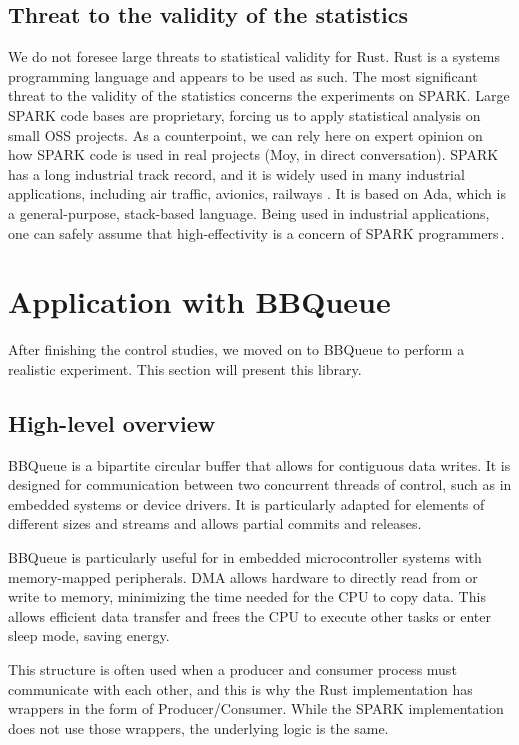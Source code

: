 \documentclass[nomenclature, english, bibtex]{kththesis}
\begin{document}
\subsection{Threat to the validity of the statistics}

We do not foresee large threats to statistical validity for Rust. Rust is a systems programming language and appears to be used as such. The most significant threat to the validity of the statistics concerns the experiments on SPARK. Large SPARK code bases are proprietary, forcing us to apply statistical analysis on small \gls{OSS} projects. As a counterpoint, we can rely here on expert opinion on how SPARK code is used in real projects (Moy, in direct conversation). SPARK has a long industrial track record, and it is widely used in many industrial applications, including air traffic, avionics, railways \etc. It is based on Ada, which is a general-purpose, stack-based language. Being used in industrial applications, one can safely assume that high-effectivity is a concern of SPARK programmers\,\cite{chapman_adacore_2018}.

\section[BBQueue]{Application with BBQueue}
\label{sec:methodBBQueue}

After finishing the control studies, we moved on to BBQueue to perform a realistic experiment. This section will present this library.

\subsection{High-level overview}
BBQueue is a bipartite circular buffer that allows for contiguous data writes. It is designed for communication between two concurrent threads of control, such as in embedded systems or device drivers. It is particularly adapted for elements of different sizes and streams and allows partial commits and releases.

BBQueue is particularly useful for  in embedded microcontroller systems with memory-mapped peripherals. DMA allows hardware to directly read from or write to memory, minimizing the time needed for the CPU to copy data. This allows efficient data transfer and frees the CPU to execute other tasks or enter sleep mode, saving energy.

This structure is often used when a producer and consumer process must communicate with each other, and this is why the Rust implementation has wrappers in the form of Producer/Consumer. While the SPARK implementation does not use those wrappers, the underlying logic is the same.
\end{document}
